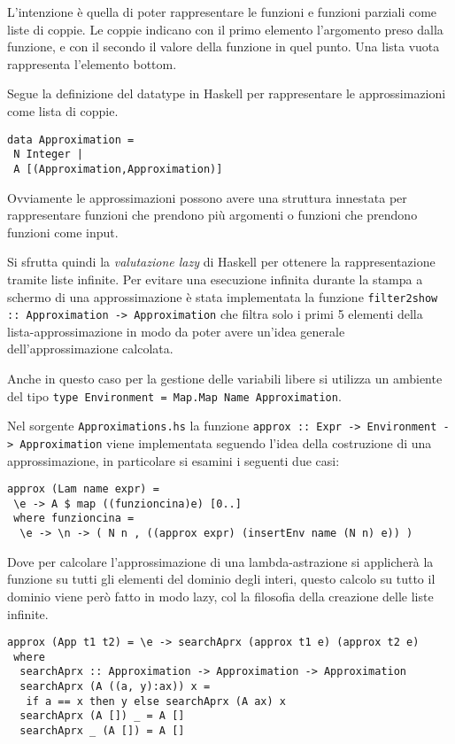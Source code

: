 \documentclass{article}
\begin{document}
L'intenzione è quella di poter rappresentare le funzioni e funzioni parziali come liste di coppie. Le coppie indicano con il primo elemento l'argomento preso dalla funzione, e con il secondo il valore della funzione in quel punto. Una lista vuota rappresenta l'elemento bottom.

Segue la definizione del datatype in Haskell per rappresentare le approssimazioni come lista di coppie.

\begin{verbatim}
data Approximation = 
 N Integer |
 A [(Approximation,Approximation)]
\end{verbatim}

Ovviamente le approssimazioni possono avere una struttura innestata per rappresentare funzioni che prendono più argomenti o funzioni che prendono funzioni come input.

Si sfrutta quindi la \emph{valutazione lazy} di Haskell per ottenere la rappresentazione tramite liste infinite.
Per evitare una esecuzione infinita durante la stampa a schermo di una approssimazione è stata implementata la funzione \texttt{filter2show :: Approximation -> Approximation} che filtra solo i primi 5 elementi della lista-approssimazione in modo da poter avere un'idea generale dell'approssimazione calcolata.

Anche in questo caso per la gestione delle variabili libere si utilizza un ambiente del tipo \texttt{type Environment = Map.Map Name Approximation}.

Nel sorgente \texttt{Approximations.hs} la funzione \texttt{approx :: Expr -> Environment -> Approximation} viene implementata seguendo l'idea della costruzione di una approssimazione, in particolare si esamini i seguenti due casi:

\begin{verbatim}
approx (Lam name expr) = 
 \e -> A $ map ((funzioncina)e) [0..]
 where funzioncina = 
  \e -> \n -> ( N n , ((approx expr) (insertEnv name (N n) e)) )
\end{verbatim}

Dove per calcolare l'approssimazione di una lambda-astrazione si applicherà la funzione su tutti gli elementi del dominio degli interi, questo calcolo su tutto il dominio viene però fatto in modo lazy, col la filosofia della creazione delle liste infinite.

\begin{verbatim}
approx (App t1 t2) = \e -> searchAprx (approx t1 e) (approx t2 e)
 where
  searchAprx :: Approximation -> Approximation -> Approximation
  searchAprx (A ((a, y):ax)) x =
   if a == x then y else searchAprx (A ax) x
  searchAprx (A []) _ = A []
  searchAprx _ (A []) = A []
\end{verbatim}
\end{document}
